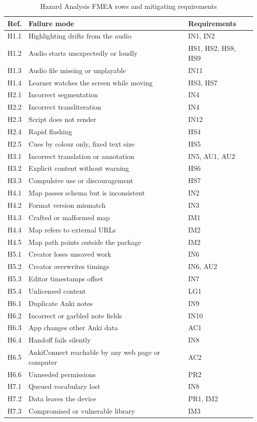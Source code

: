 \documentclass[12pt]{article}
\begin{document}
\begin{longtable}{@{}lP{0.6\textwidth}l@{}}
\caption{Hazard Analysis FMEA rows and mitigating requirements}
\label{TblHazTrace}\\
\toprule
\textbf{Ref.} & \textbf{Failure mode} & \textbf{Requirements}\\
\midrule
\endhead
H1.1 & Highlighting drifts from the audio & IN1, IN2\\
H1.2 & Audio starts unexpectedly or loudly & HS1, HS2, HS8, HS9\\
H1.3 & Audio file missing or unplayable & IN11\\
H1.4 & Learner watches the screen while moving & HS3, HS7\\
H2.1 & Incorrect segmentation & IN4\\
H2.2 & Incorrect transliteration & IN4\\
H2.3 & Script does not render & IN12\\
H2.4 & Rapid flashing & HS4\\
H2.5 & Cues by colour only, fixed text size & HS5\\
H3.1 & Incorrect translation or annotation & IN5, AU1, AU2\\
H3.2 & Explicit content without warning & HS6\\
H3.3 & Compulsive use or discouragement & HS7\\
H4.1 & Map passes schema but is inconsistent & IN2\\
H4.2 & Format version mismatch & IN3\\
H4.3 & Crafted or malformed map & IM1\\
H4.4 & Map refers to external URLs & IM2\\
H4.5 & Map path points outside the package & IM2\\
H5.1 & Creator loses unsaved work & IN6\\
H5.2 & Creator overwrites timings & IN6, AU2\\
H5.3 & Editor timestamps offset & IN7\\
H5.4 & Unlicensed content & LG1\\
H6.1 & Duplicate Anki notes & IN9\\
H6.2 & Incorrect or garbled note fields & IN10\\
H6.3 & App changes other Anki data & AC1\\
H6.4 & Handoff fails silently & IN8\\
H6.5 & AnkiConnect reachable by any web page or computer & AC2\\
H6.6 & Unneeded permissions & PR2\\
H7.1 & Queued vocabulary lost & IN8\\
H7.2 & Data leaves the device & PR1, IM2\\
H7.3 & Compromised or vulnerable library & IM3\\
\bottomrule
\end{longtable}
\end{document}
